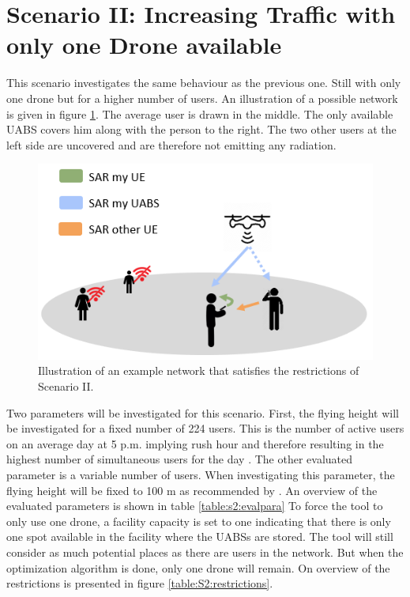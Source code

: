 
\FloatBarrier
\section{Scenario II: Increasing Traffic with only one Drone available}

This scenario investigates the same behaviour as the previous one. Still with only one drone but for a higher number of users. 
An illustration of a possible network is given in figure \ref{fig:IllustrationS2}. The average user is drawn in the middle. The only available \gls{UABS} covers him along with the person to the right.
The two other  users at the left side are uncovered and are therefore not  emitting any radiation.
\begin{figure}[H]
\centering
  \includegraphics[width=\textwidth/5*3]{../images/IllustrationS2.png}
  \caption{Illustration of an example network that satisfies the restrictions of Scenario II.}
  \label{fig:IllustrationS2}
\end{figure}

Two parameters will be investigated for this scenario. First, the
flying height will be investigated for a fixed number of 224 users. 
This is the number of active users on an average day at 5 p.m. implying rush hour and therefore 
resulting in the highest number of simultaneous users for the day \cite{J2}. The other 
evaluated parameter is a variable number of users. When investigating this 
parameter, the flying height will be fixed to 100 m as recommended by \cite{J2}.
An overview of the evaluated parameters is shown in table \ref{table:s2:evalpara}
 To force the tool to only use one drone, a facility capacity is set to one 
indicating that there is only one spot available in the facility where the \gls{UABS}s are stored. The tool will still consider as much potential places 
as there are users in the network. But when the optimization algorithm is done, only one drone will remain.
On overview of the restrictions is presented in figure \ref{table:S2:restrictions}.

